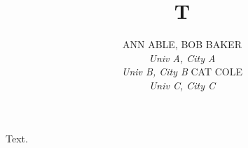 \documentclass{article}
\def\Mr{\uppercase}
\def\vsm{\vskip0.1cm}
\def\authors#1{\author{\parbox{.9\textwidth}{\begin{flushleft}{#1}\end{flushleft}}}}
\def\authord#1#2{\indent\Mr{#1}\\
  \textit{\indent#2}\vsm}
\begin{document}
\title{T}
\authors{\authord{Ann Able, Bob Baker}
{Univ A, City A\\ Univ B, City B}
\authord{Cat Cole}
{Univ C, City C}
}
\maketitle
Text.
\end{document}
